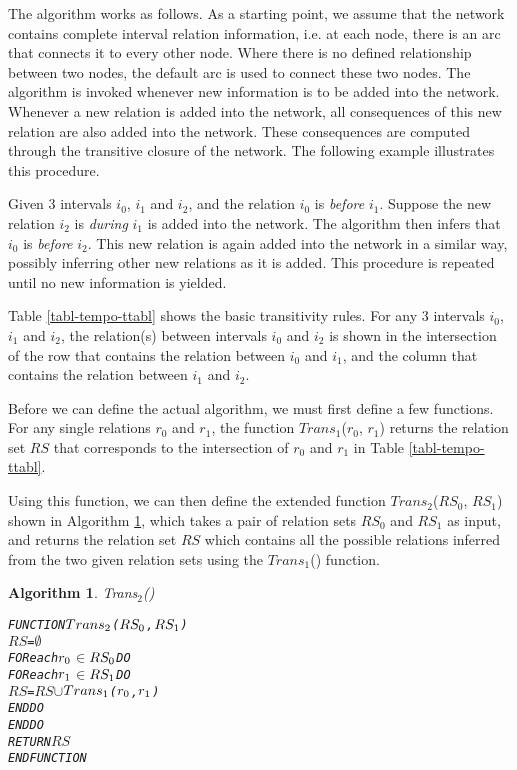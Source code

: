 \documentclass[11pt]{report}
\newenvironment{vverbatim}
{
  \begin{alltt}
}
{
    \vspace{-\baselineskip}
  \end{alltt}
}
\newtheorem{vvalgorithm}{Algorithm}[chapter]
\newenvironment{valgorithm}[2]
{
  \begin{vvalgorithm}{#1}
    \label{#2}
    \small
    \begin{vverbatim}
}
{
    \end{vverbatim}
  \end{vvalgorithm}
}
\begin{document}
          The algorithm works as follows. As a starting point, we assume that
          the network contains complete interval relation information, i.e. at
          each node, there is an arc that connects it to every other node.
          Where there is no defined relationship between two nodes, the default
          arc is used to connect these two nodes. The algorithm is invoked
          whenever new information is to be added into the network. Whenever a
          new relation is added into the network, all consequences of this new
          relation are also added into the network. These consequences are
          computed through the transitive closure of the network. The following
          example illustrates this procedure.

          Given 3 intervals $i_0$, $i_1$ and $i_2$, and the relation $i_0$ is
          {\em before} $i_1$. Suppose the new relation $i_2$ is {\em during}
          $i_1$ is added into the network. The algorithm then infers that
          $i_0$ is {\em before} $i_2$. This new relation is again added into
          the network in a similar way, possibly inferring other new relations
          as it is added. This procedure is repeated until no new information
          is yielded.

          Table \ref{tabl-tempo-ttabl} shows the basic transitivity rules. For
          any 3 intervals $i_0$, $i_1$ and $i_2$, the relation(s) between
          intervals $i_0$ and $i_2$ is shown in the intersection of the row
          that contains the relation between $i_0$ and $i_1$, and the column
          that contains the relation between $i_1$ and $i_2$.

          Before we can define the actual algorithm, we must first define a few
          functions. For any single relations $r_0$ and $r_1$, the function
          $Trans_1$($r_0$, $r_1$) returns the relation set $RS$ that
          corresponds to the intersection of $r_0$ and $r_1$ in Table
          \ref{tabl-tempo-ttabl}.

          Using this function, we can then define the extended function
          $Trans_2$($RS_0$, $RS_1$) shown in Algorithm \ref{algo-tempo-trns2},
          which takes a pair of relation sets $RS_0$ and $RS_1$ as input, and
          returns the relation set $RS$ which contains all the possible
          relations inferred from the two given relation sets using the
          $Trans_1$() function.

          \begin{valgorithm}{Trans$_2$()}{algo-tempo-trns2}
FUNCTION \(Trans\sb{2}\)(\(RS\sb{0}\), \(RS\sb{1}\))
  \(RS\) = \(\emptyset\)
  FOR each \(r\sb{0}\) \(\in\) \(RS\sb{0}\) DO
    FOR each \(r\sb{1}\) \(\in\) \(RS\sb{1}\) DO
      \(RS\) = \(RS\) \(\cup\) \(Trans\sb{1}\)(\(r\sb{0}\), \(r\sb{1}\))
    ENDDO
  ENDDO
  RETURN \(RS\)
ENDFUNCTION
          \end{valgorithm}
\end{document}
